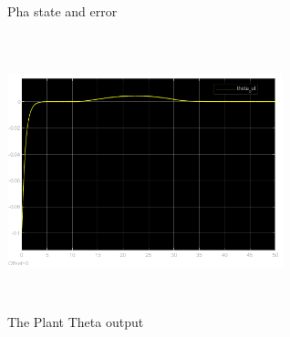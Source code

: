 \documentclass[12pt, a4paper]{article}
\begin{document}
\begin{enumerate}[1.]
\begin{figure}[H]
        \caption{Pha state and error}
        \label{fig:example}%
    \end{figure}
\begin{figure}[H]
    \centering
    \includegraphics[width=8cm,height=8cm,scale=0.6]{theta_out.png}
    \caption{The Plant Theta output}
    \label{fig:label}
    \end{figure}


\end{enumerate}
\end{document}
